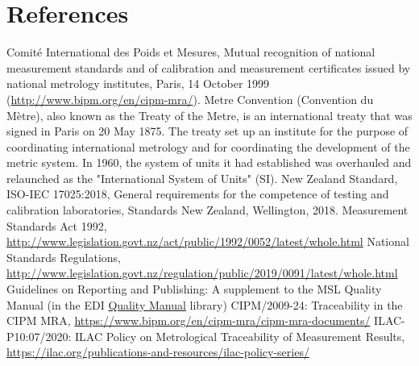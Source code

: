 \section{References}

\begingroup
\renewcommand{\section}[2]{}%

\begin{thebibliography}{9}
 Comit\'e International des Poids et Mesures, Mutual recognition of national measurement standards and of calibration and measurement certificates issued by national metrology institutes, Paris, 14 October 1999 (\url{http://www.bipm.org/en/cipm-mra/}).
 Metre Convention (Convention du M\`etre), also known as the Treaty of the Metre, is an international treaty that was signed in Paris on 20 May 1875. The treaty set up an institute for the purpose of coordinating international metrology and for coordinating the development of the metric system. In 1960, the system of units it had established was overhauled and relaunched as the "International System of Units" (SI).
 New Zealand Standard, ISO-IEC 17025:2018, General requirements for the competence of testing and calibration laboratories, Standards New Zealand, Wellington, 2018.
 {Measurement Standards Act 1992}, \url{http://www.legislation.govt.nz/act/public/1992/0052/latest/whole.html}
 {National Standards Regulations}, \url{http://www.legislation.govt.nz/regulation/public/2019/0091/latest/whole.html}
 Guidelines on Reporting and Publishing: A supplement to the MSL Quality Manual (in the EDI \href{https://edi.callaghaninnovation.govt.nz/ws/msl/QMS/QM?Web=1}{Quality Manual} library)
 {CIPM/2009-24: Traceability in the CIPM MRA}, \url{https://www.bipm.org/en/cipm-mra/cipm-mra-documents/}
 {ILAC-P10:07/2020: ILAC Policy on Metrological Traceability of Measurement Results}, \url{https://ilac.org/publications-and-resources/ilac-policy-series/}
\end{thebibliography}

\endgroup